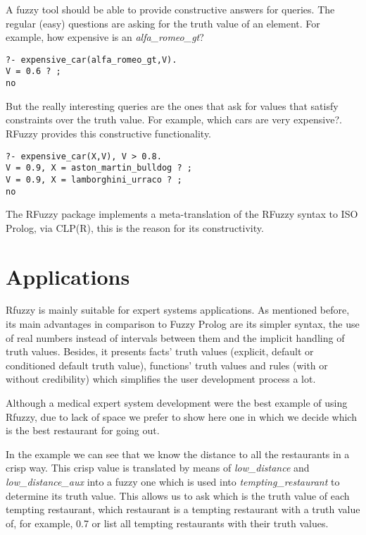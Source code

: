 \documentclass[runningheads,a4paper]{llncs}
\begin{document}
A fuzzy tool
should be able to provide constructive answers for queries. The
regular (easy) questions are asking for the truth value of an
element. For example, how expensive is an {\it alfa\_romeo\_gt}?
\begin{verbatim}
?- expensive_car(alfa_romeo_gt,V).
V = 0.6 ? ;
no
\end{verbatim}
But the really interesting queries are the ones that ask for values
that satisfy constraints over the truth value. For example, which
cars are very expensive?. RFuzzy provides this constructive
functionality.
\begin{verbatim}
?- expensive_car(X,V), V > 0.8.
V = 0.9, X = aston_martin_bulldog ? ;
V = 0.9, X = lamborghini_urraco ? ;
no
\end{verbatim}

The RFuzzy package implements a meta-translation of the RFuzzy syntax
to ISO Prolog, via CLP(R), this is the reason for its
constructivity.



\section{Applications}

Rfuzzy is mainly suitable for expert systems applications.
As mentioned before, its main advantages in comparison to Fuzzy Prolog are 
its simpler syntax, the use of real numbers instead of intervals 
between them and the implicit handling of truth values.
Besides, it presents 
facts' truth values (explicit, default or conditioned default truth value), 
functions' truth values and rules (with or without credibility) 
which simplifies the user development process a lot.

Although a medical expert system development were the best example of  
using Rfuzzy, due to lack of space we prefer to show here one     
in which we decide which is the best restaurant for going out.       




In the example we can see that we know the distance to all the 
restaurants in a crisp way. This crisp value is translated by means of
{\it low\_distance} and {\it low\_distance\_aux} into a fuzzy one 
which is used into {\it tempting\_restaurant} to determine its 
truth value. This allows us to ask which is the truth value of each 
tempting restaurant, which restaurant is a tempting 
restaurant with a truth value of, for example, 0.7 or list all 
tempting restaurants with their truth values.
\end{document}
